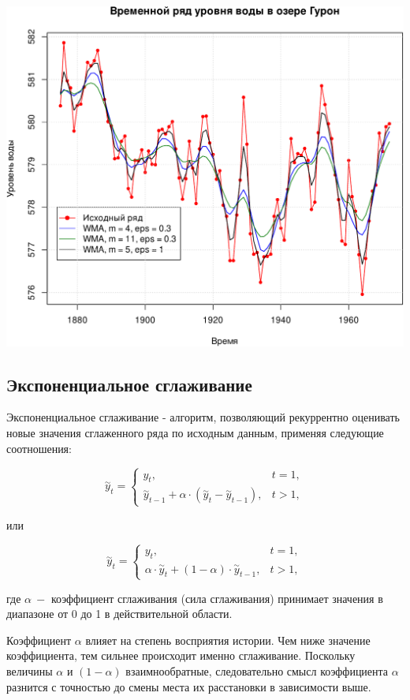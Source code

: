 \documentclass[
]{article}
\begin{document}
\begin{center}\includegraphics[width=0.6\linewidth]{Prac6_files/figure-latex/unnamed-chunk-10-1} \end{center}

\hypertarget{ux44dux43aux441ux43fux43eux43dux435ux43dux446ux438ux430ux43bux44cux43dux43eux435-ux441ux433ux43bux430ux436ux438ux432ux430ux43dux438ux435}{%
\subsection{\texorpdfstring{\textbf{Экспоненциальное
сглаживание}}{Экспоненциальное сглаживание}}\label{ux44dux43aux441ux43fux43eux43dux435ux43dux446ux438ux430ux43bux44cux43dux43eux435-ux441ux433ux43bux430ux436ux438ux432ux430ux43dux438ux435}}

Экспоненциальное сглаживание - алгоритм, позволяющий рекуррентно
оценивать новые значения сглаженного ряда по исходным данным, применяя
следующие соотношения:

\[
\overset{\sim}{y}_t = \left\{ \begin{matrix} y_t, & t = 1,\\
\overset{\sim}{y}_{t-1} + \alpha\cdot (\overset{\sim}{y}_t - \overset{\sim}{y}_{t-1}), & t > 1,\end{matrix} \right.
\]

или

\[
\overset{\sim}{y}_t = \left\{ \begin{matrix} y_t, & t = 1,\\
\alpha \cdot \overset{\sim}{y}_t + (1 - \alpha) \cdot \overset{\sim}{y}_{t-1}, & t > 1,\end{matrix} \right.
\]

где \(\alpha\ -\) коэффициент сглаживания (сила сглаживания) принимает
значения в диапазоне от 0 до 1 в действительной области.

Коэффициент \(\alpha\) влияет на степень восприятия истории. Чем ниже
значение коэффициента, тем сильнее происходит именно сглаживание.
Поскольку величины \(\alpha\) и \((1 - \alpha)\) взаимнообратные,
следовательно смысл коэффициента \(\alpha\) разнится с точностью до
смены места их расстановки в зависимости выше.
\end{document}
